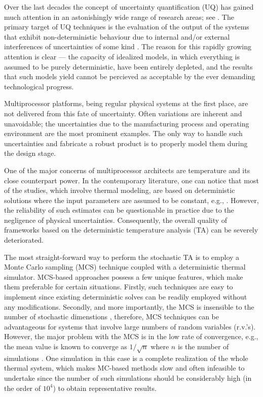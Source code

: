 Over the last decades the concept of uncertainty quantification (UQ) has gained much attention in an astonishingly wide range of research areas; see \cite{xiu2009}. The primary target of UQ techniques is the evaluation of the output of the systems that exhibit non-deterministic behaviour due to internal and/or external interferences of uncertainties of some kind \cite{eldred2009}. The reason for this rapidly growing attention is clear --- the capacity of idealized models, in which everything is assumed to be purely deterministic, have been entirely depleted, and the results that such models yield cannot be percieved as acceptable by the ever demanding technological progress.

Multiprocessor platforms, being regular physical systems at the first place, are not delivered from this fate of uncertainty. Often variations are inherent and unavoidable; the uncertainties due to the manufacturing process and operating environment are the most prominent examples. The only way to handle such uncertainties and fabricate a robust product is to properly model them during the design stage.

One of the major concerns of multiprocessor architects are temperature and its close counterpart power. In the contemporary literature, one can notice that most of the studies, which involve thermal modeling, are based on deterministic solutions where the input parameters are assumed to be constant, e.g., \cite{ukhov2012}. However, the reliability of such estimates can be questionable in practice due to the negligence of physical uncertainties. Consequently, the overall quality of frameworks based on the deterministic temperature analysis (TA) can be severely deteriorated.

The most straight-forward way to perform the stochastic TA is to employ a Monte Carlo sampling (MCS) technique coupled with a deterministic thermal simulator. MCS-based approaches possess a few unique features, which make them preferable for certain situations. Firstly, such techniques are easy to implement since existing deterministic solves can be readily employed without any modifications. Secondly, and more importantly, the MCS is insensible to the number of stochastic dimenstions \cite{maitre2010}, therefore, MCS techniques can be advantageous for systems that involve large numbers of random variables (r.v.'s). However, the major problem with the MCS is in the low rate of convergence, e.g., the mean value is known to converge as $1/\sqrt{n}$ where $n$ is the number of simulations \cite{xiu2009, maitre2010}. One simulation in this case is a complete realization of the whole thermal system, which makes MC-based methods slow and often infeasible to undertake since the number of such simulations should be considerably high (in the order of $10^4$) to obtain representative results.

